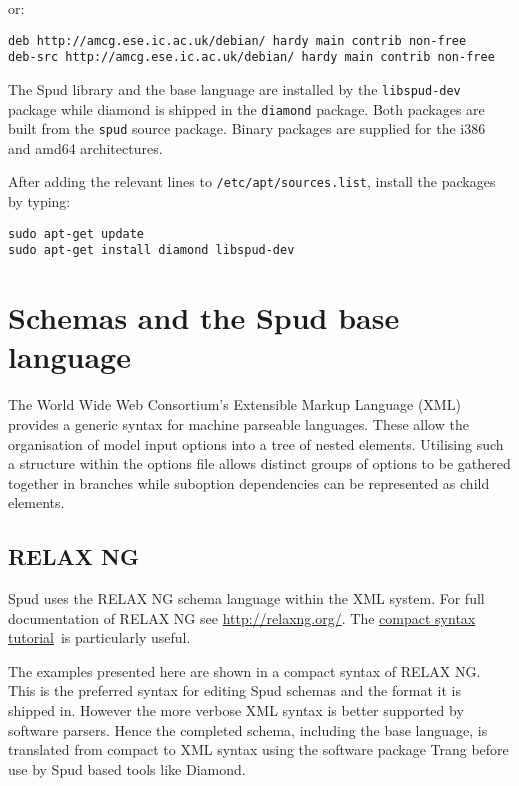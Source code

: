 \documentclass[a4paper, 11pt]{book}
\begin{document}
or:

\begin{verbatim}
deb http://amcg.ese.ic.ac.uk/debian/ hardy main contrib non-free
deb-src http://amcg.ese.ic.ac.uk/debian/ hardy main contrib non-free
\end{verbatim}

The Spud library and the base language are installed by the
\verb+libspud-dev+ package while diamond is shipped in the \verb+diamond+
package. Both packages are built from the \verb+spud+ source package. Binary
packages are supplied for the i386 and amd64 architectures.

After adding the relevant lines to \verb+/etc/apt/sources.list+, install the
packages by typing:

\begin{verbatim}
sudo apt-get update
sudo apt-get install diamond libspud-dev
\end{verbatim}

\chapter{Schemas and the Spud base language}
\lstset{language=rnc}

The World Wide Web Consortium's Extensible Markup Language (XML) provides a
generic syntax for machine parseable languages.  These allow the
organisation of model input options into a tree of nested elements.
Utilising such a structure within the options file allows distinct groups of
options to be gathered together in branches while suboption dependencies can
be represented as child elements.

\section{RELAX NG}

Spud uses the RELAX NG schema language within the XML system. For full
documentation of RELAX NG see \url{http://relaxng.org/}. The
\href{http://relaxng.org/compact-tutorial-20030326.html}{compact syntax
  tutorial}\ is particularly useful.

The examples presented here are shown in a compact syntax of RELAX NG.  This
is the preferred syntax for editing Spud schemas and the format it is
shipped in.  However the more verbose XML syntax is better supported by
software parsers.  Hence the completed schema, including the base language,
is translated from compact to XML syntax using the software package Trang
before use by Spud based tools like Diamond.
\end{document}
